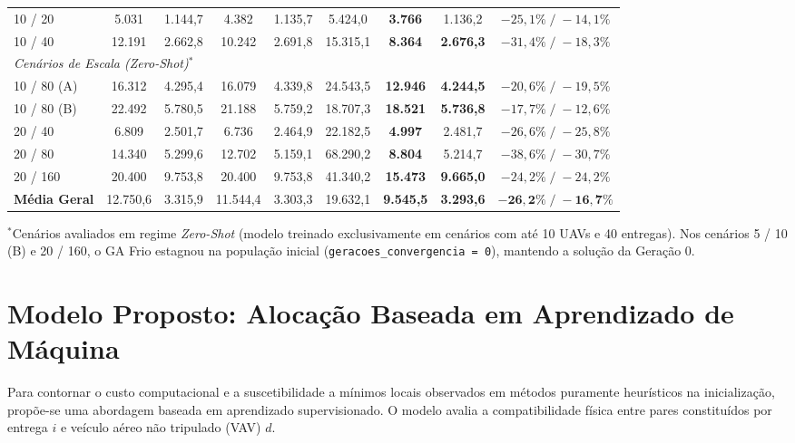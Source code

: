 \begin{table}[htbp]
{\begin{tabular}{lcccccccc}
    10 / 20     & 5.031  & 1.144,7 & 4.382  & 1.135,7 & 5.424,0  & \textbf{3.766}  & 1.136,2          & $-25,1\% \;/\; -14,1\%$ \\
    10 / 40     & 12.191 & 2.662,8 & 10.242 & 2.691,8 & 15.315,1 & \textbf{8.364}  & \textbf{2.676,3} & $-31,4\% \;/\; -18,3\%$ \\
    \midrule
    \multicolumn{9}{l}{\textit{Cenários de Escala (Zero-Shot)}$^*$} \\
    10 / 80 (A) & 16.312 & 4.295,4 & 16.079 & 4.339,8 & 24.543,5 & \textbf{12.946} & \textbf{4.244,5} & $-20,6\% \;/\; -19,5\%$ \\
    10 / 80 (B) & 22.492 & 5.780,5 & 21.188 & 5.759,2 & 18.707,3 & \textbf{18.521} & \textbf{5.736,8} & $-17,7\% \;/\; -12,6\%$ \\
    20 / 40     & 6.809  & 2.501,7 & 6.736  & 2.464,9 & 22.182,5 & \textbf{4.997}  & 2.481,7          & $-26,6\% \;/\; -25,8\%$ \\
    20 / 80     & 14.340 & 5.299,6 & 12.702 & 5.159,1 & 68.290,2 & \textbf{8.804}  & 5.214,7          & $-38,6\% \;/\; -30,7\%$ \\
    20 / 160    & 20.400 & 9.753,8 & 20.400 & 9.753,8 & 41.340,2 & \textbf{15.473} & \textbf{9.665,0} & $-24,2\% \;/\; -24,2\%$ \\
    \midrule
    \textbf{Média Geral} & 12.750,6 & 3.315,9 & 11.544,4 & 3.303,3 & 19.632,1 & \textbf{9.545,5} & \textbf{3.293,6} & $\mathbf{-26,2\% \;/\; -16,7\%}$ \\
    \bottomrule
    \end{tabular}%
    }
    \vspace{1mm}
    
    \footnotesize{$^*$Cenários avaliados em regime \textit{Zero-Shot} (modelo treinado exclusivamente em cenários com até 10 UAVs e 40 entregas). Nos cenários 5 / 10 (B) e 20 / 160, o GA Frio estagnou na população inicial (\texttt{geracoes\_convergencia = 0}), mantendo a solução da Geração 0.}
\end{table}
    
\section{Modelo Proposto: Alocação Baseada em Aprendizado de Máquina}
\label{sec:modelo_proposto}

Para contornar o custo computacional e a suscetibilidade a mínimos locais observados em métodos puramente heurísticos na inicialização, propõe-se uma abordagem baseada em aprendizado supervisionado. O modelo avalia a compatibilidade física entre pares constituídos por entrega $i$ e veículo aéreo não tripulado (VAV) $d$.

